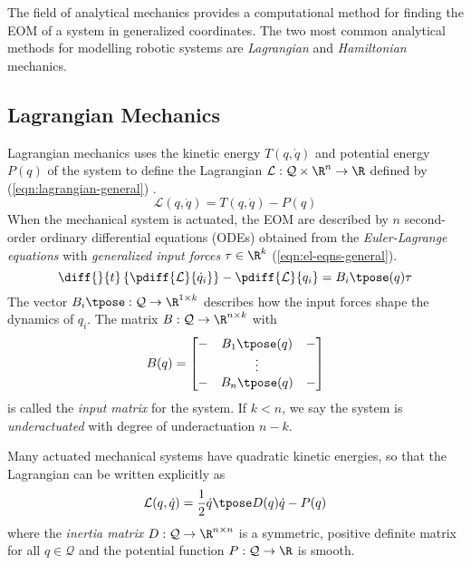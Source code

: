 The field of analytical mechanics provides a computational method for finding
the EOM of a system in generalized coordinates. The two most common analytical
methods for modelling robotic systems are \textit{Lagrangian} and
\textit{Hamiltonian} mechanics.

\subsection{Lagrangian Mechanics}

Lagrangian mechanics uses the kinetic energy \(T(q,\dot{q})\) and potential
energy \(P(q)\) of the system to define the Lagrangian 
\(\mathcal{L} : \mathcal{Q}\times\R^n \rightarrow \R\) defined by
(\ref{eqn:lagrangian-general}) \cite{greenwood_dynamics}.
\begin{equation}\label{eqn:lagrangian-general}
    \mathcal{L}(q,\dot{q}) = T(q,\dot{q}) - P(q)
\end{equation}
When the mechanical system is actuated, the EOM are described by \(n\) second-order
ordinary differential equations (ODEs) obtained from the \textit{Euler-Lagrange
equations} with \textit{generalized input forces} \(\tau \in \R^k\) 
(\ref{eqn:el-eqns-general}). 
\begin{equation}\label{eqn:el-eqns-general}
    \diff{}{t}\left\{ \pdiff{\mathcal{L}}{\dot{q}_i} \right\}
    - \pdiff{\mathcal{L}}{q_i} = B_i\tpose(q) \tau
\end{equation}
The vector \(B_i\tpose: \mathcal{Q} \rightarrow \R^{1\times k}\) describes how
the input forces shape the dynamics of \(q_i\).
The matrix  \(B: \mathcal{Q} \rightarrow \R^{n \times k}\) with
\[
    B(q) = \begin{bmatrix}
        - & B_1\tpose(q) & - \\
          & \vdots & \\
        - & B_n\tpose(q) & - \\
    \end{bmatrix}
\]
is called the \textit{input matrix} for the system.
If \(k < n\), we say the system is \textit{underactuated} with degree of
underactuation \(n - k\).

Many actuated mechanical systems have quadratic kinetic energies, so that the
Lagrangian can be written explicitly as
\begin{equation}\label{eqn:lagrangian}
    \mathcal{L}(q,\dot{q}) = \frac{1}{2} \dot{q}\tpose D(q) \dot{q} - P(q)
\end{equation}
where the \textit{inertia matrix} \(D: \mathcal{Q} \rightarrow \R^{n\times n}\) 
is a symmetric, positive definite matrix for all \(q \in \mathcal{Q}\) and the
potential function \(P : \mathcal{Q} \rightarrow \R\) is smooth. 

